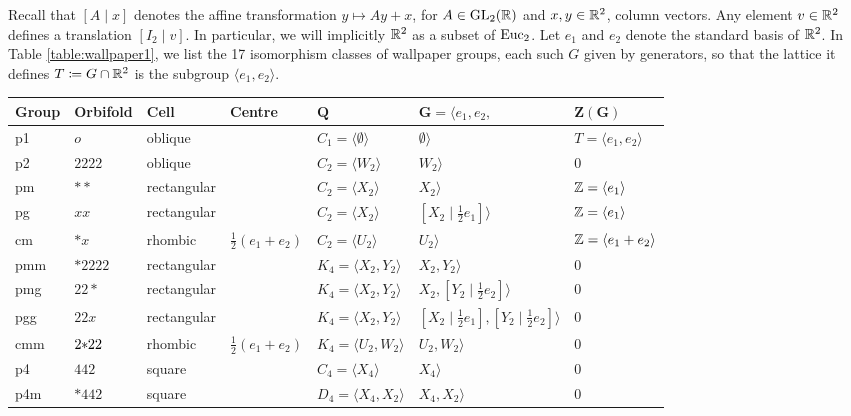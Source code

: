 Recall that $[A\mid x]$ denotes the affine transformation $y\mapsto Ay+x$, for $A \in \operatorname{GL}_2({\mathbb R})$ and $x,y \in {\mathbb R}^2$, column vectors. Any element $v \in {\mathbb R}^2$ defines a translation $[I_2 \mid v]$. In particular, we will implicitly ${\mathbb R}^2$ as a subset of $\operatorname{Euc}_2$. Let $e_1$ and $e_2$ denote the standard basis of ${\mathbb R}^2$. In Table \ref{table:wallpaper1}, we list the 17 isomorphism classes of wallpaper groups, each such $G$ given by generators, so that the lattice it defines $T \coloneqq G \cap {\mathbb R}^2$ is the subgroup $\langle e_1, e_2 \rangle$. 

\begin{table}[!htbp]
  \centering
\small
\begin{tabular}{lllllll}
\toprule
\textbf{Group} & \textbf{Orbifold} & \textbf{Cell} & \textbf{Centre} & $\boldsymbol{Q}$ & $\boldsymbol{G}=\langle e_1,e_2,$ & $\boldsymbol{Z(G)}$ \\
\midrule
p1   & $o$       & oblique     &  & $C_1=\langle \emptyset \rangle$ &  $\emptyset \rangle$ & $T=\langle e_1,e_2\rangle$ \\
p2   & $2222$    & oblique     &  & $C_2=\langle W_2\rangle$ &  $W_2\rangle$ & $0$ \\
\midrule
pm   & $**$      & rectangular &  & $C_2=\langle X_2\rangle$ & $X_2\rangle$ & ${\mathbb Z} =\langle e_1\rangle$ \\
pg   &  $xx$      & rectangular &  & $C_2=\langle X_2\rangle$ & $[X_2\mid \tfrac12 e_1]\rangle$ & ${\mathbb Z}=\langle e_1\rangle$ \\
cm   & $*x$      & rhombic & $\tfrac12 (e_1+e_2) $ & $C_2=\langle U_2\rangle$ & $U_2\rangle$ &  ${\mathbb Z} =\langle e_1+e_2\rangle$ \\
pmm  & $*2222$   & rectangular &  & $K_4=\langle X_2,Y_2\rangle$ & $X_2,Y_2\rangle$ & $0$\\
pmg  &  $22*$     & rectangular &  & $K_4=\langle X_2,Y_2\rangle$ &$X_2, [Y_2\mid\tfrac12 e_2] \rangle$ &  $0$\\
pgg  & $22x$     & rectangular &  & $K_4=\langle X_2,Y_2\rangle$ & $[X_2\mid\tfrac12 e_1] , [Y_2\mid\tfrac12 e_2] \rangle$ & $0$ \\
cmm  &  $2\hspace{-0.25em}*\hspace{-0.25em}22$    & rhombic & $\tfrac12 (e_1+e_2) $ & $K_4=\langle U_2,W_2\rangle$ &$U_2,W_2\rangle$ & $0$ \\
\midrule
p4   & $442$     & square      &  & $C_4=\langle X_4\rangle$ &  $X_4\rangle$ &   $0$  \\
p4m  & $*442$    &  square      & & $D_4=\langle X_4,X_2\rangle$ &  $X_4,X_2\rangle$ &  $0$   \\

\end{tabular}
\end{table}

